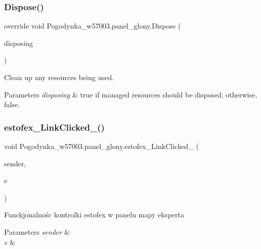 \subsubsection{\texorpdfstring{Dispose()}{Dispose()}}
{\footnotesize\ttfamily override void Pogodynka\+\_\+w57003.\+panel\+\_\+glony.\+Dispose (\begin{DoxyParamCaption}\item[{bool}]{disposing }\end{DoxyParamCaption})\hspace{0.3cm}{\ttfamily [protected]}}



Clean up any resources being used. 


\begin{DoxyParams}{Parameters}
{\em disposing} & true if managed resources should be disposed; otherwise, false.\\
\hline
\end{DoxyParams}
\mbox{\label{class_pogodynka__w57003_1_1panel__glony_aa677678689be30d9ddab7cc4de694bf0}} 
\subsubsection{\texorpdfstring{estofex\+\_\+\+Link\+Clicked\+\_()}{estofex\_LinkClicked\_1()}}
{\footnotesize\ttfamily void Pogodynka\+\_\+w57003.\+panel\+\_\+glony.\+estofex\+\_\+\+Link\+Clicked\+\_ (\begin{DoxyParamCaption}\item[{object}]{sender,  }\item[{Link\+Label\+Link\+Clicked\+Event\+Args}]{e }\end{DoxyParamCaption})\hspace{0.3cm}{\ttfamily [private]}}



Funckjonalnośc kontrolki estofex w panelu mapy eksperta 


\begin{DoxyParams}{Parameters}
{\em sender} & \\
\hline
{\em e} & \\
\hline
\end{DoxyParams}
\mbox{\label{class_pogodynka__w57003_1_1panel__glony_aa08ea57aa456c27766dcb8d032478d4b}} 
